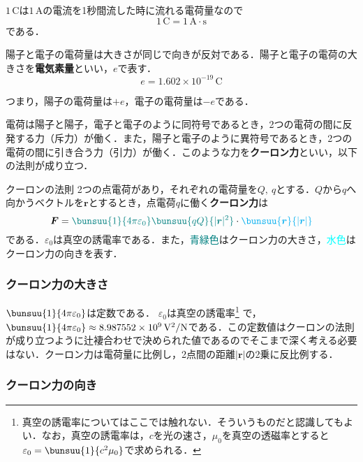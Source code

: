 $1\,\mathrm{C}$は$1\,\mathrm{A}$の電流を1秒間流した時に流れる電荷量なので
\begin{equation}
	1\,\mathrm{C} = 1\,\mathrm{A \cdot s}
\end{equation}
である．

陽子と電子の電荷量は大きさが同じで向きが反対である．陽子と電子の電荷の大きさを\textbf{電気素量}といい，$e$で表す．
\begin{equation}
	e = 1.602 \times 10^{-19}\,\mathrm{C}
\end{equation}

つまり，陽子の電荷量は$+e$，電子の電荷量は$-e$である．

電荷は陽子と陽子，電子と電子のように同符号であるとき，2つの電荷の間に反発する力（斥力）が働く．また，陽子と電子のように異符号であるとき，2つの電荷の間に引き合う力（引力）が働く．このような力を\textbf{クーロン力}といい，以下の法則が成り立つ．

\begin{kousiki}{クーロンの法則}
	2つの点電荷があり，それぞれの電荷量を$Q,\ q$とする．$Q$から$q$へ向かうベクトルを$\bm{r}$とするとき，点電荷$q$に働く\textbf{クーロン力}は
	\begin{equation}
		\bm{F} = {\color{teal}
			\bunsuu{1}{4\pi \varepsilon_0}\bunsuu{qQ}{|\bm{r}|^2}
		}
		\cdot 
		{\color{cyan}
			\bunsuu{\bm{r}}{|\bm{r}|}
		}
	\end{equation}
	である．$\varepsilon_0$は真空の誘電率である．また，\textcolor{teal}{青緑色}はクーロン力の大きさ，\textcolor{cyan}{水色}はクーロン力の向きを表す．
\end{kousiki}



\subsubsection*{クーロン力の大きさ}

$\bunsuu{1}{4\pi\varepsilon_0}$は定数である．
$\varepsilon_0$は真空の誘電率\footnote{真空の誘電率についてはここでは触れない．そういうものだと認識してもよい．なお，真空の誘電率は，$c$を光の速さ，$\mu_0$を真空の透磁率とすると$\varepsilon_0 = \bunsuu{1}{c^2\mu_0}$で求められる．} で，
$\bunsuu{1}{4\pi\varepsilon_0} \approx 8.987552 \times 10^9\, \mathrm{V^2 / N}$である．この定数値はクーロンの法則が成り立つように辻褄合わせで決められた値であるのでそこまで深く考える必要はない．クーロン力は電荷量に比例し，2点間の距離$|\bm{r}|$の2乗に反比例する．



\subsubsection*{クーロン力の向き}

